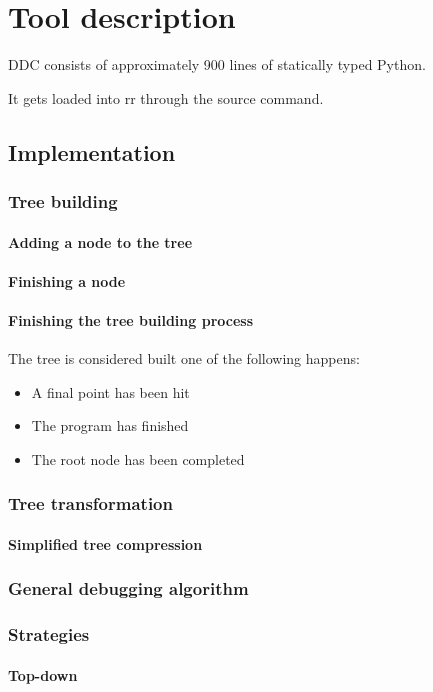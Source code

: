 \chapter{Tool description}
\label{cap:descripcionHerramienta}
DDC consists of approximately 900 lines of statically typed Python.

It gets loaded into rr through the source command.

\section{Implementation}
\subsection{Tree building}
\subsubsection{Adding a node to the tree}
\subsubsection{Finishing a node}
\subsubsection{Finishing the tree building process}
The tree is considered built one of the following happens:
\begin{itemize}
    \item A final point has been hit
    \item The program has finished
    \item The root node has been completed
\end{itemize}
\subsection{Tree transformation}
\subsubsection{Simplified tree compression}
\subsection{General debugging algorithm}
\subsection{Strategies}
\subsubsection{Top-down}
